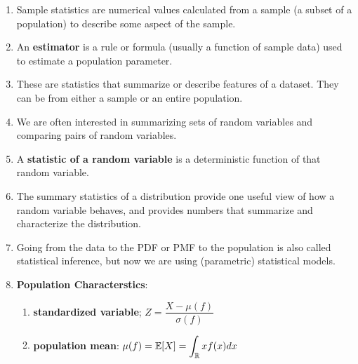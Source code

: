 \begin{enumerate}
    \item Sample statistics are numerical values calculated from a sample (a subset of a population) to describe some aspect of the sample.
    \hfill \cite{common/online/chatgpt}

    \item An \textbf{estimator} is a rule or formula (usually a function of sample data) used to estimate a population parameter.
    \hfill \cite{common/online/chatgpt}

    \item These are statistics that summarize or describe features of a dataset.
    They can be from either a sample or an entire population.
    \hfill \cite{common/online/chatgpt}

    \item We are often interested in summarizing sets of random variables and comparing pairs of random variables.
    \hfill \cite{mfml/book/mml/Deisenroth-Faisal-Ong}

    \item A \textbf{statistic of a random variable} is a deterministic function of that random variable.
    \hfill \cite{mfml/book/mml/Deisenroth-Faisal-Ong}

    \item The summary statistics of a distribution provide one useful view of how a random variable behaves, and provides numbers that summarize and characterize the distribution.
    \hfill \cite{mfml/book/mml/Deisenroth-Faisal-Ong}

    \item Going from the data to the PDF or PMF to the population is also called statistical inference, but now we are using (parametric) statistical models.
    \hfill \cite{statistics/book/Statistics-for-Data-Scientists/Maurits-Kaptein}

    \item \textbf{Population Characterstics}:
    \begin{enumerate}
        \item \textbf{standardized variable};
        $
            Z = \dfrac{X - \mu( f )}{\sigma ( f )}
        $
        \hfill \cite{statistics/book/Statistics-for-Data-Scientists/Maurits-Kaptein}

        \item \textbf{population mean}:
        $
            \mu  ( f )
            = \mathbb{E}[X]
            = \displaystyle\int _{\mathbb{R}} x f (x)dx
        $
        \hfill \cite{statistics/book/Statistics-for-Data-Scientists/Maurits-Kaptein}


\end{enumerate}
\end{enumerate}
